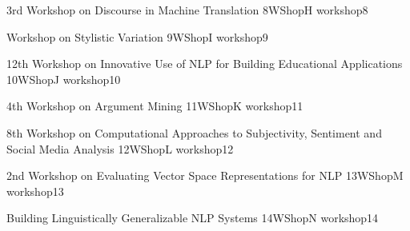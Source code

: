 \documentclass{book}
\begin{document}
\begin{wsschedule}
  {3rd Workshop on Discourse in Machine Translation}
  {8}{WShopH}
  {workshop8}
  {\WShopLocH}
  
\end{wsschedule}

\begin{wsschedule}
  {Workshop on Stylistic Variation}
  {9}{WShopI}
  {workshop9}
  {\WShopLocI}
  
\end{wsschedule}

\begin{wsschedule}
  {12th Workshop on Innovative Use of NLP for Building Educational Applications}
  {10}{WShopJ}
  {workshop10}
  {\WShopLocJ}
  
\end{wsschedule}

\begin{wsschedule}
  {4th Workshop on Argument Mining}
  {11}{WShopK}
  {workshop11}
  {\WShopLocK}
  
\end{wsschedule}

\begin{wsschedule}
  {8th Workshop on Computational Approaches to Subjectivity, Sentiment and Social Media Analysis}
  {12}{WShopL}
  {workshop12}
  {\WShopLocL}
  
\end{wsschedule}

\begin{wsschedule}
  {2nd Workshop on Evaluating Vector Space Representations for NLP}
  {13}{WShopM}
  {workshop13}
  {\WShopLocM}
  
\end{wsschedule}

\begin{wsschedule}
  {Building Linguistically Generalizable NLP Systems}
  {14}{WShopN}
  {workshop14}
  {\WShopLocN}
  
\end{wsschedule}
\end{document}
